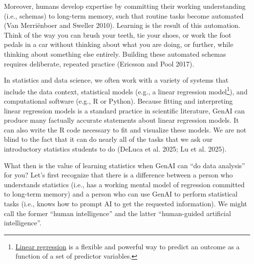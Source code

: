 \documentclass[
]{hdsr}
\begin{document}
Moreover, humans develop expertise by committing their working
understanding (i.e., schemas) to long-term memory, such that routine
tasks become automated (Van Merriënboer and Sweller 2010). Learning is
the result of this automation. Think of the way you can brush your
teeth, tie your shoes, or work the foot pedals in a car without thinking
about what you are doing, or further, while thinking about something
else entirely. Building these automated schemas requires deliberate,
repeated practice (Ericsson and Pool 2017).

In statistics and data science, we often work with a variety of systems
that include the data context, statistical models (e.g., a linear
regression model\footnote{\href{https://en.wikipedia.org/wiki/Linear_regression}{Linear
  regression} is a flexible and powerful way to predict an outcome as a
  function of a set of predictor variables.}), and computational
software (e.g., R or Python). Because fitting and interpreting linear
regression models is a standard practice in scientific literature, GenAI
can produce many factually accurate statements about linear regression
models. It can also write the R code necessary to fit and visualize
these models. We are not blind to the fact that it can do nearly all of
the tasks that we ask our introductory statistics students to do (DeLuca
et al. 2025; {Lu et al.} 2025).

What then is the value of learning statistics when GenAI can ``do data
analysis'' for you? Let's first recognize that there is a difference
between a person who understands statistics (i.e., has a working mental
model of regression committed to long-term memory) and a person who can
use GenAI to perform statistical tasks (i.e., knows how to prompt AI to
get the requested information). We might call the former ``human
intelligence'' and the latter ``human-guided artificial intelligence''.
\end{document}
